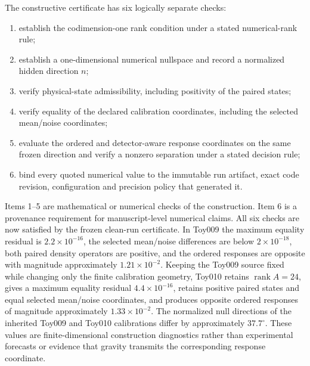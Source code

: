 \documentclass[11pt]{article}
\begin{document}
The constructive certificate has six logically separate checks:
\begin{enumerate}
 \item establish the codimension-one rank condition under a stated numerical-rank rule;
 \item establish a one-dimensional numerical nullspace and record a normalized hidden direction $n$;
 \item verify physical-state admissibility, including positivity of the paired states;
 \item verify equality of the declared calibration coordinates, including the selected mean/noise coordinates;
 \item evaluate the ordered and detector-aware response coordinates on the same frozen direction and verify a nonzero separation under a stated decision rule;
 \item bind every quoted numerical value to the immutable run artifact, exact code revision, configuration and precision policy that generated it.
\end{enumerate}
Items 1--5 are mathematical or numerical checks of the construction. Item 6 is a provenance requirement for manuscript-level numerical claims. All six checks are now satisfied by the frozen clean-run certificate. In Toy009 the maximum equality residual is $2.2\times10^{-16}$, the selected mean/noise differences are below $2\times10^{-18}$, both paired density operators are positive, and the ordered responses are opposite with magnitude approximately $1.21\times10^{-2}$. Keeping the Toy009 source fixed while changing only the finite calibration geometry, Toy010 retains $\operatorname{rank}A=24$, gives a maximum equality residual $4.4\times10^{-16}$, retains positive paired states and equal selected mean/noise coordinates, and produces opposite ordered responses of magnitude approximately $1.33\times10^{-2}$. The normalized null directions of the inherited Toy009 and Toy010 calibrations differ by approximately $37.7^\circ$. These values are finite-dimensional construction diagnostics rather than experimental forecasts or evidence that gravity transmits the corresponding response coordinate.
\end{document}
